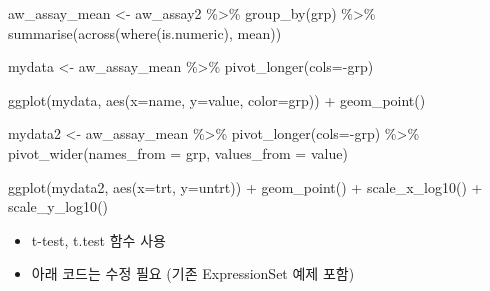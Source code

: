 \documentclass[
]{book}
\newenvironment{Shaded}{\begin{snugshade}}{\end{snugshade}}
\newcommand{\AttributeTok}[1]{\textcolor[rgb]{0.77,0.63,0.00}{#1}}
\newcommand{\FunctionTok}[1]{\textcolor[rgb]{0.00,0.00,0.00}{#1}}
\newcommand{\NormalTok}[1]{#1}
\newcommand{\OtherTok}[1]{\textcolor[rgb]{0.56,0.35,0.01}{#1}}
\newcommand{\SpecialCharTok}[1]{\textcolor[rgb]{0.00,0.00,0.00}{#1}}
\providecommand{\tightlist}{%
  \setlength{\itemsep}{0pt}\setlength{\parskip}{0pt}}
\begin{document}
\begin{Shaded}
\begin{Highlighting}[]

\NormalTok{aw\_assay\_mean }\OtherTok{\textless{}{-}}\NormalTok{ aw\_assay2 }\SpecialCharTok{\%\textgreater{}\%} 
  \FunctionTok{group\_by}\NormalTok{(grp) }\SpecialCharTok{\%\textgreater{}\%} 
  \FunctionTok{summarise}\NormalTok{(}\FunctionTok{across}\NormalTok{(}\FunctionTok{where}\NormalTok{(is.numeric), mean))}

\NormalTok{mydata }\OtherTok{\textless{}{-}}\NormalTok{ aw\_assay\_mean }\SpecialCharTok{\%\textgreater{}\%} 
  \FunctionTok{pivot\_longer}\NormalTok{(}\AttributeTok{cols=}\SpecialCharTok{{-}}\NormalTok{grp) }

\FunctionTok{ggplot}\NormalTok{(mydata, }\FunctionTok{aes}\NormalTok{(}\AttributeTok{x=}\NormalTok{name, }\AttributeTok{y=}\NormalTok{value, }\AttributeTok{color=}\NormalTok{grp)) }\SpecialCharTok{+}
  \FunctionTok{geom\_point}\NormalTok{()}

\NormalTok{mydata2 }\OtherTok{\textless{}{-}}\NormalTok{ aw\_assay\_mean }\SpecialCharTok{\%\textgreater{}\%} 
  \FunctionTok{pivot\_longer}\NormalTok{(}\AttributeTok{cols=}\SpecialCharTok{{-}}\NormalTok{grp) }\SpecialCharTok{\%\textgreater{}\%} 
  \FunctionTok{pivot\_wider}\NormalTok{(}\AttributeTok{names\_from =}\NormalTok{ grp, }\AttributeTok{values\_from =}\NormalTok{ value)}

\FunctionTok{ggplot}\NormalTok{(mydata2, }\FunctionTok{aes}\NormalTok{(}\AttributeTok{x=}\NormalTok{trt, }\AttributeTok{y=}\NormalTok{untrt)) }\SpecialCharTok{+}
  \FunctionTok{geom\_point}\NormalTok{() }\SpecialCharTok{+} 
  \FunctionTok{scale\_x\_log10}\NormalTok{() }\SpecialCharTok{+}
  \FunctionTok{scale\_y\_log10}\NormalTok{()}
\end{Highlighting}
\end{Shaded}

\begin{itemize}
\tightlist
\item
  t-test, t.test 함수 사용
\item
  아래 코드는 수정 필요 (기존 ExpressionSet 예제 포함)
\end{itemize}
\end{document}
